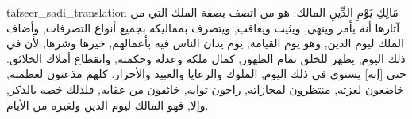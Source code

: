\begin{taggedblock}{tafseer_sadi_translation}
{ مَالِكِ يَوْمِ الدِّينِ }
المالك: هو من اتصف بصفة الملك التي من آثارها أنه يأمر وينهى, ويثيب ويعاقب, ويتصرف بمماليكه بجميع أنواع التصرفات, وأضاف الملك ليوم الدين, وهو يوم القيامة, يوم يدان الناس فيه بأعمالهم, خيرها وشرها, لأن في ذلك اليوم, يظهر للخلق تمام الظهور, كمال ملكه وعدله وحكمته, وانقطاع أملاك الخلائق. حتى
[إنه]
يستوي في ذلك اليوم, الملوك والرعايا والعبيد والأحرار. كلهم مذعنون لعظمته, خاضعون لعزته, منتظرون لمجازاته, راجون ثوابه, خائفون من عقابه, فلذلك خصه بالذكر, وإلا, فهو المالك ليوم الدين ولغيره من الأيام.
\end{taggedblock}

\begin{comment}
Please use the following for footnotes:- Sample\footnoteQ{Text of Qur'an footnote goes here.}.
Sample\footnoteT{Text of Tafseer footnote goes here.}.
\end{comment}
